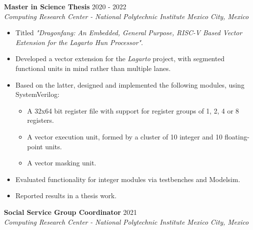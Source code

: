 \documentclass[10pt]{article}
\begin{document}
	\noindent
	\textbf{Master in Science Thesis}
			\hfill 2020 - 2022 \\
	\textit{Computing Research Center - 
			National Polytechnic Institute
			\hfill Mexico City, Mexico}
	
	\vspace{2em}

	\begin{minipage}{5.5in}
		\begin{itemize}
			\item Titled \emph{"Dragonfang: An Embedded, General Purpose, RISC-V
				Based Vector Extension for the Lagarto Hun Processor"}.

			\item Developed a vector extension for the \emph{Lagarto} project,
				with segmented functional units in mind rather than multiple
				lanes.

			\item Based on the latter, designed and implemented the following
				modules, using SystemVerilog:

				\begin{itemize}
					\item A 32x64 bit register file with support for
						register groups of 1, 2, 4 or 8 registers.

					\item A vector execution unit, formed by a cluster of 10
						integer and 10 floating-point units.

					\item A vector masking unit.
				\end{itemize}

			\item Evaluated functionality for integer modules via testbenches
				and Modelsim.

			\item Reported results in a thesis work.
		\end{itemize}
	\end{minipage}

	\newpage

	\noindent
	\textbf{Social Service Group Coordinator}
			\hfill 2021 \\
	\textit{Computing Research Center - 
			National Polytechnic Institute
			\hfill Mexico City, Mexico}
	
	\vspace{2em}
\end{document}

